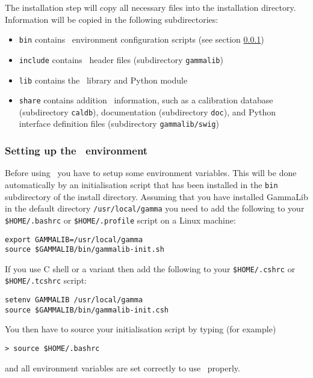 \documentclass{article}[12pt,a4]
\begin{document}
The installation step will copy all necessary files into the installation directory.
Information will be copied in the following subdirectories:
\begin{itemize}
\item {\tt bin} contains \this\ environment configuration scripts (see section \ref{sec:environment})
\item {\tt include} contains \this\ header files (subdirectory {\tt gammalib})
\item {\tt lib} contains the \this\ library and Python module
\item {\tt share} contains addition \this\ information, such as a calibration database
(subdirectory {\tt caldb}), documentation (subdirectory {\tt doc}), and Python interface
definition files (subdirectory {\tt gammalib/swig})
\end{itemize}


\subsubsection{Setting up the \this\ environment}
\label{sec:environment}

Before using \this\ you have to setup some environment variables. 
This will be done automatically by an initialisation script that has been installed in the {\tt bin} 
subdirectory of the install directory. 
Assuming that you have installed GammaLib in the default directory {\tt /usr/local/gamma} you
need to add the following to your {\tt \$HOME/.bashrc} or {\tt \$HOME/.profile} script on a Linux 
machine:
\begin{verbatim}
export GAMMALIB=/usr/local/gamma
source $GAMMALIB/bin/gammalib-init.sh
\end{verbatim}

If you use C shell or a variant then add the following to your {\tt \$HOME/.cshrc} or {\tt \$HOME/.tcshrc}
script:
\begin{verbatim}
setenv GAMMALIB /usr/local/gamma
source $GAMMALIB/bin/gammalib-init.csh
\end{verbatim}

You then have to source your initialisation script by typing (for example)
\begin{verbatim}
> source $HOME/.bashrc
\end{verbatim}
and all environment variables are set correctly to use \this\ properly.


\end{document}
